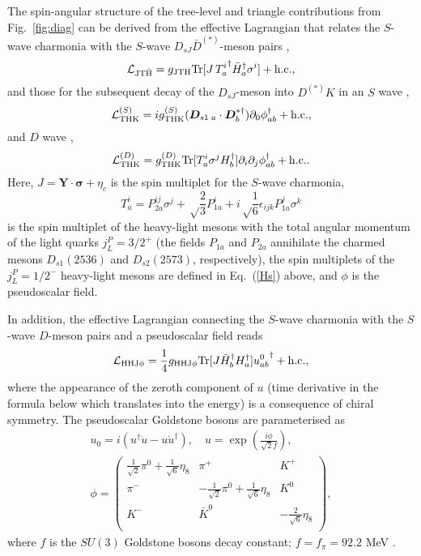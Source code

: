 \documentclass[preprint,12pt,3p]{elsarticle}
\newcommand{\tr}{\mbox{Tr}}
\newcommand{\be}{\begin{equation}}
\newcommand{\ee}{\end{equation}}
\newcommand{\bea}{\begin{eqnarray}}
\newcommand{\eea}{\end{eqnarray}}
\newcommand{\ds}{\displaystyle}
\def\vec#1{\boldsymbol{#1}}
\begin{document}
The spin-angular structure of the tree-level and triangle
contributions from Fig.~\ref{fig:diag} can be derived from the
effective Lagrangian that relates the $S$-wave charmonia with the $S$-wave $D_{sJ}\bar{D}^{(*)}$-meson pairs \cite{Guo:2014ura},
\be 
{\cal L}_{\rm JT\bar H}=g_{\rm JT H}\tr[J\, {T^i_a}^\dagger \bar H_a^\dagger \sigma^i] +{\rm h.c.},
\label{L_YTH}
\ee
and those for the subsequent decay of the $D_{sJ}$-meson into $D^{(*)} K$ in an $S$ wave \cite{Guo:2020oqk},
\be
{\cal L}_{\rm THK}^{(S)}=ig_{\rm THK}^{(S)}(\vec{D}_{s1\;a}\cdot\vec{D}^{*\dagger}_b)\partial_0 \phi_{ab}^\dagger+{\rm h.c.},
\label{L_THKS}
\ee
and $D$ wave \cite{Colangelo:2005gb}, 
\be
{\cal L}_{\rm THK}^{(D)}=g_{\rm THK}^{(D)}\tr[{T^i_a} \sigma^j H_b^\dagger ] \partial_i \partial_j\phi_{ab}^\dagger+{\rm h.c.}.
\label{L_THKD}
\ee
Here, $J=\vec{Y}\cdot\boldsymbol{\sigma}+\eta_c$ is the spin multiplet for the $S$-wave charmonia, 
\be
T_a^i=P_{2a}^{ij}\sigma^j +\displaystyle\sqrt\frac23 P_{1a}^{i} + i \sqrt\frac16 \epsilon_{ijk}P_{1a}^{j}\sigma^k
\label{T_DsJ}
\ee
is the spin multiplet of the heavy-light mesons with the total angular momentum of the light quarks $j_L^P=3/2^+$ (the fields $P_{1a}$ and $P_{2a}$ annihilate the charmed mesons $D_{s1}(2536)$ and $D_{s2}(2573)$, respectively), the spin multiplets of the $j_L^P=1/2^-$ heavy-light mesons are defined in Eq.~(\ref{Hs}) above, and $\phi$ is the pseudoscalar field.

In addition, the effective Lagrangian connecting the $S$-wave charmonia with the $S$-wave $D$-meson pairs and a pseudoscalar field reads \cite{Mehen:2011yh} 
\bea 
{\cal L}_{\rm HHJ \phi}= 
\frac{1}{4}g_{\rm HHJ\phi}\tr[J \bar H_b^\dagger H_a^\dagger ]{u^0_{ab}}^\dagger +{\rm h.c.},
\label{L_YHHK}
\eea
where the appearance of the zeroth component of $u$ (time derivative in the formula below which translates into the energy) is a consequence of chiral symmetry. The pseudoscalar Goldstone bosons are parameterised as 
\bea
&u_0=i\left(u^\dagger \dot{u}-u\dot{u}^\dagger\right),\quad \ds u = \exp \left( \frac{i\phi}{\sqrt{2}f}\right),& \\
&\ds \phi = \begin{pmatrix}
 {\frac{1}{\sqrt{2}}\pi ^0 +\frac{1}{\sqrt{6}}\eta _8 } & {\pi^+ } & {K^+ } \\
 {\pi^- } & {-\frac{1}{\sqrt{2}}\pi ^0 +\frac{1}{\sqrt{6}}\eta _8} & {K^0 } \\
 { K^-} & {\bar{K}^0 } & {-\frac{2}{\sqrt{6}}\eta_8 } \\
 \end{pmatrix},&\nonumber 
 \label{eq:u-phi-def}
 \eea 
where $f$ is the $SU(3)$ Goldstone bosons decay constant; $f=f_{\pi}=92.2$ MeV \cite{Zyla:2020zbs}.
\end{document}
